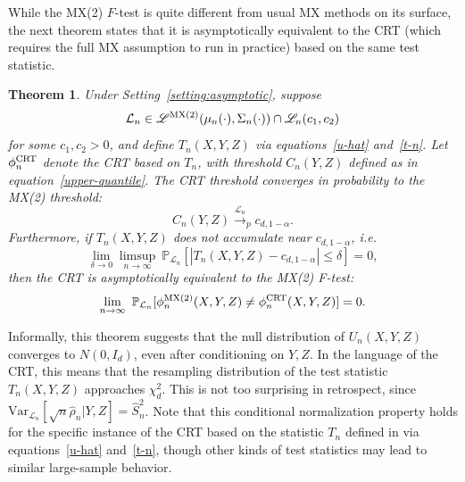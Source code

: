 \documentclass[12pt]{article}
\newtheorem{theorem}{Theorem}
\theoremstyle{definition}
\theoremstyle{remark}
\newcommand{\srx}{X}
\newcommand{\srz}{Z}
\newcommand{\sry}{Y}
\begin{document}
While the MX(2) $F$-test is quite different from usual MX methods on its surface, the next theorem states that it is asymptotically equivalent to the CRT (which requires the full MX assumption to run in practice) based on the same test statistic.
\begin{theorem} \label{thm:equivalence}
Under Setting~\ref{setting:asymptotic}, suppose
	\begin{equation}
		\mathcal L_n \in \mathscr L^{\textnormal{MX(2)}}(\mu_n(\cdot), \Sigma_n(\cdot)) \cap \mathscr L_n(c_1,c_2)
	\end{equation}
	for some $c_1, c_2 > 0$, and define $T_n(\srx, \sry, \srz)$ via equations~\eqref{u-hat} and~\eqref{t-n}. Let $\phi_n^{\textnormal{CRT}}$ denote the CRT based on $T_n$, with threshold $C_n(\sry, \srz)$ defined as in equation~\eqref{upper-quantile}. The CRT threshold converges in probability to the MX(2) threshold:
	\begin{equation}
		C_n(Y,Z) \overset{\mathcal L_n}\rightarrow_p c_{d,1-\alpha}.
		\label{eq:threshold-convergence}
	\end{equation}
Furthermore, if $T_n(\srx, \sry, \srz)$ does not accumulate near $c_{d,1-\alpha}$, i.e.
		\begin{equation}
		\lim_{\delta \rightarrow 0}\limsup_{n \rightarrow \infty}\ \mathbb P_{\mathcal L_n}[|T_n(\srx, \sry, \srz)-c_{d,1-\alpha}| \leq \delta] = 0,
		\label{eq:non-accumulation}
		\end{equation}
	 	then the CRT is asymptotically equivalent to the MX(2) F-test:
		\begin{equation}
			\lim_{n \rightarrow \infty}\ \mathbb P_{\mathcal L_n}[\phi^{\textnormal{MX(2)}}_n(\srx, \sry, \srz) \neq \phi^{\textnormal{CRT}}_n(\srx, \sry, \srz)] = 0.
			\label{eq:asymptotic-equivalence}
		\end{equation}	
\end{theorem}

Informally, this theorem suggests that the null distribution of $U_n(\srx, \sry, \srz)$ converges to $N(0, I_d)$, even after conditioning on $\sry, \srz$. In the language of the CRT, this means that the resampling distribution of the test statistic $T_n(\srx, \sry, \srz)$ approaches $\chi^2_d$. This is not too surprising in retrospect, since $\text{Var}_{\mathcal L_n}[\sqrt n \widehat \rho_n | \sry, \srz] = \widehat S_n^2$.  Note that this conditional normalization property holds for the specific instance of the CRT based on the statistic $T_n$ defined in via equations~\eqref{u-hat} and~\eqref{t-n}, though other kinds of test statistics may lead to similar large-sample behavior. 
\end{document}
